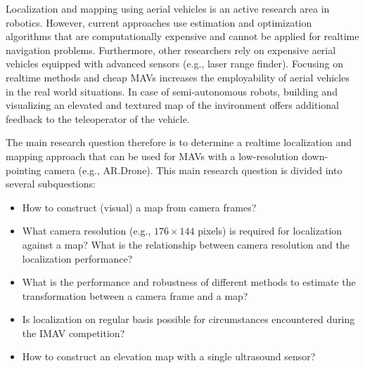 Localization and mapping using aerial vehicles is an active research area in robotics.
However, current approaches use estimation and optimization algorithms that are computationally expensive and cannot be applied for realtime navigation problems.
Furthermore, other researchers rely on expensive aerial vehicles equipped with advanced sensors (e.g., laser range finder).
Focusing on realtime methods and cheap MAVs increases the employability of aerial vehicles in the real world situations.
In case of semi-autonomous robots, building and visualizing an elevated and textured map of the invironment offers additional feedback to the teleoperator of the vehicle.

The main research question therefore is to determine a realtime localization and mapping approach that can be used for MAVs with a low-resolution down-pointing camera (e.g., AR.Drone).
This main research question is divided into several subquestions:
\begin{itemize}
\item How to construct (visual) a map from camera frames?
\item What camera resolution (e.g., $176 \times 144$ pixels) is required for localization against a map? What is the relationship between camera resolution and the localization performance?
\item What is the performance and robustness of different methods to estimate the transformation between a camera frame and a map?
\item Is localization on regular basis possible for circumstances encountered during the IMAV competition?
\item How to construct an elevation map with a single ultrasound sensor?
\end{itemize}

